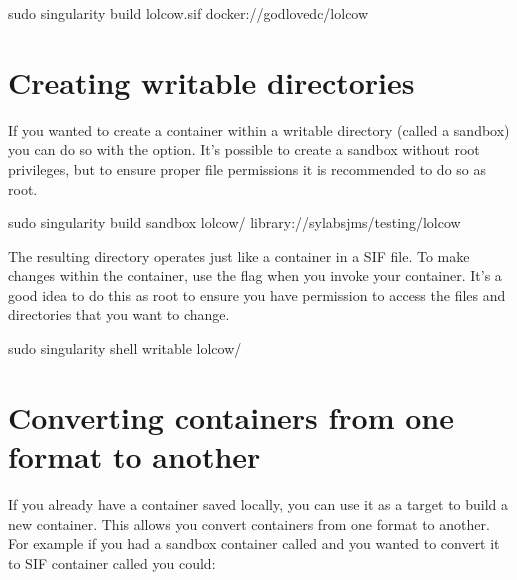\documentclass[letterpaper,10pt,english]{sphinxmanual}
\begin{document}
%
\begin{sphinxVerbatim}[commandchars=\\\{\}]
\PYGZdl{} sudo singularity build lolcow.sif docker://godlovedc/lolcow
\end{sphinxVerbatim}


\section{Creating writable  directories}
\label{\detokenize{build_a_container:creating-writable-sandbox-directories}}
If you wanted to create a container within a writable directory (called a
sandbox) you can do so with the  option. It’s possible to create a
sandbox without root privileges, but to ensure proper file permissions it is
recommended to do so as root.

%
\begin{sphinxVerbatim}[commandchars=\\\{\}]
\PYGZdl{} sudo singularity build \PYGZhy{}\PYGZhy{}sandbox lolcow/ library://sylabs\PYGZhy{}jms/testing/lolcow
\end{sphinxVerbatim}

The resulting directory operates just like a container in a SIF file. To make
changes within the container, use the  flag when you invoke your
container.  It’s a good idea to do this as root to ensure you have permission to
access the files and directories that you want to change.

%
\begin{sphinxVerbatim}[commandchars=\\\{\}]
\PYGZdl{} sudo singularity shell \PYGZhy{}\PYGZhy{}writable lolcow/
\end{sphinxVerbatim}


\section{Converting containers from one format to another}
\label{\detokenize{build_a_container:converting-containers-from-one-format-to-another}}
If you already have a container saved locally, you can use it as a target to
build a new container. This allows you convert containers from one format to
another. For example if you had a sandbox container called  and
you wanted to convert it to SIF container called  you could:
\end{document}
